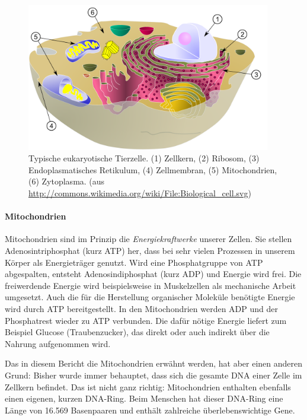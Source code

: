 \begin{figure}[htbp]
\begin{center}
\includegraphics[width=0.95\textwidth]{bilder/Zelle}
\end{center}
\caption[Typische eukaryotische Tierzelle. (aus \protect\url{http://commons.wikimedia.org/wiki/File:Biological_cell.svg})] {Typische eukaryotische Tierzelle. (1) Zellkern, (2) Ribosom, (3) Endoplasmatisches Retikulum, (4) Zellmembran, (5) Mitochondrien, (6) Zytoplasma. (aus \protect\url{http://commons.wikimedia.org/wiki/File:Biological_cell.svg})}
\label{fig:bio:zelle}
\end{figure}

\paragraph{Mitochondrien}

Mitochondrien sind im Prinzip die \textit{Energiekraftwerke} unserer Zellen. Sie stellen Adenosintriphosphat (kurz ATP) her, dass bei sehr vielen Prozessen in unserem Körper als Energieträger genutzt. Wird eine Phosphatgruppe von ATP abgespalten, entsteht Adenosindiphosphat (kurz ADP) und Energie wird frei. Die freiwerdende Energie wird beispielsweise in Muskelzellen als mechanische Arbeit umgesetzt. Auch die für die Herstellung organischer Moleküle benötigte Energie wird durch ATP bereitgestellt. In den Mitochondrien werden ADP und der Phosphatrest wieder zu ATP verbunden. Die dafür nötige Energie liefert zum Beispiel Glucose (Traubenzucker), das direkt oder auch indirekt über die Nahrung aufgenommen wird.

Das in diesem Bericht die Mitochondrien erwähnt werden, hat aber einen anderen Grund: Bisher wurde immer behauptet, dass sich die gesamte DNA einer Zelle im Zellkern befindet. Das ist nicht ganz richtig: Mitochondrien enthalten ebenfalls einen eigenen, kurzen DNA-Ring. Beim Menschen hat dieser DNA-Ring eine Länge von 16.569 Basenpaaren \citep{Mitomap} und enthält zahlreiche überlebenswichtige Gene.

